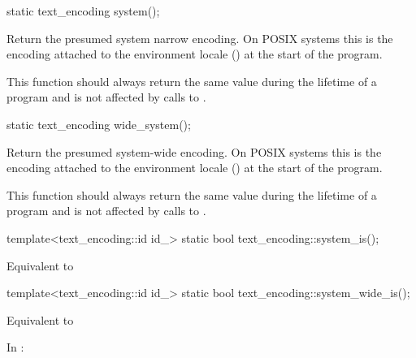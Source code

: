 \documentclass{wg21}
\begin{document}
\begin{addedblock}
\begin{itemdecl}
static text_encoding system();
\end{itemdecl}

\begin{itemdescr}
Return the presumed system narrow encoding.
On POSIX systems this is the encoding attached to the environment locale () at the start of the program.

\begin{note}
This function should always return the same value during the lifetime of a program and is not affected by calls to .
\end{note}
\end{itemdescr}

\begin{itemdecl}
static text_encoding wide_system();
\end{itemdecl}

\begin{itemdescr}
Return the presumed system-wide encoding.
On POSIX systems this is the encoding attached to the environment locale () at the start of the program.

\begin{note}
This function should always return the same value during the lifetime of a program and is not affected by calls to .
\end{note}
\end{itemdescr}

\begin{itemdecl}
template<text_encoding::id id_>
static bool text_encoding::system_is();
\end{itemdecl}

\begin{itemdescr}
\returns Equivalent to 
\end{itemdescr}

\begin{itemdecl}
template<text_encoding::id id_>
static bool text_encoding::system_wide_is();
\end{itemdecl}

\begin{itemdescr}
\returns Equivalent to 
\end{itemdescr}


\end{addedblock}

In \tcode{[locale]}:
\end{document}
